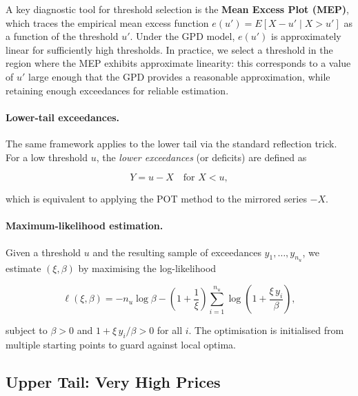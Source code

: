 A key diagnostic tool for threshold selection is the \textbf{Mean Excess Plot (MEP)}, which traces the empirical mean excess function
$
e(u') = E[X - u' \mid X > u']
$
as a function of the threshold \(u'\). Under the GPD model, \(e(u')\) is approximately linear 
for sufficiently high thresholds. In practice, we select a threshold in the region where the MEP exhibits 
approximate linearity: this corresponds to a value of \(u'\) large enough that the GPD provides a reasonable 
approximation, while retaining enough exceedances for reliable estimation.

\paragraph{Lower-tail exceedances.}
The same framework applies to the lower tail via the standard reflection trick. For a
low threshold $u$, the \emph{lower exceedances} (or deficits) are defined as

\begin{equation}
    Y = u - X \quad \text{for } X < u,
    \label{eq:lower_excess}
\end{equation}

which is equivalent to applying the POT method to the mirrored series $-X$.

\paragraph{Maximum-likelihood estimation.}
Given a threshold $u$ and the resulting sample of exceedances
$y_1, \ldots, y_{n_u}$, we estimate $(\xi, \beta)$ by maximising the
log-likelihood

\begin{equation}
    \ell(\xi, \beta) = -n_u \log \beta
    - \left(1 + \frac{1}{\xi}\right) \sum_{i=1}^{n_u} \log\!\left(1 + \frac{\xi\, y_i}{\beta}\right),
    \label{eq:gpd_ll}
\end{equation}

subject to $\beta > 0$ and $1 + \xi\, y_i / \beta > 0$ for all $i$. The optimisation
is initialised from multiple starting points to guard against local optima.

\subsection{Upper Tail: Very High Prices}
\label{subsec:upper_tail}

